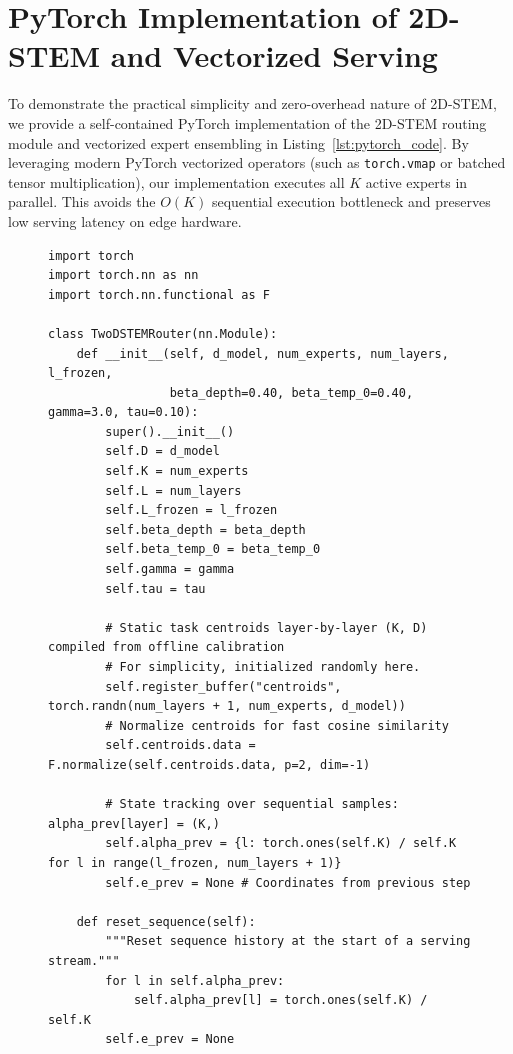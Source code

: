 \section{PyTorch Implementation of 2D-STEM and Vectorized Serving}
\label{sec:pytorch_implementation}

To demonstrate the practical simplicity and zero-overhead nature of 2D-STEM, we provide a self-contained PyTorch implementation of the 2D-STEM routing module and vectorized expert ensembling in Listing~\ref{lst:pytorch_code}. By leveraging modern PyTorch vectorized operators (such as \texttt{torch.vmap} or batched tensor multiplication), our implementation executes all $K$ active experts in parallel. This avoids the $O(K)$ sequential execution bottleneck and preserves low serving latency on edge hardware.

\begin{figure}[htbp]
\centering
\begin{minipage}{0.95\textwidth}
\begin{small}
\begin{verbatim}
import torch
import torch.nn as nn
import torch.nn.functional as F

class TwoDSTEMRouter(nn.Module):
    def __init__(self, d_model, num_experts, num_layers, l_frozen, 
                 beta_depth=0.40, beta_temp_0=0.40, gamma=3.0, tau=0.10):
        super().__init__()
        self.D = d_model
        self.K = num_experts
        self.L = num_layers
        self.L_frozen = l_frozen
        self.beta_depth = beta_depth
        self.beta_temp_0 = beta_temp_0
        self.gamma = gamma
        self.tau = tau
        
        # Static task centroids layer-by-layer (K, D) compiled from offline calibration
        # For simplicity, initialized randomly here.
        self.register_buffer("centroids", torch.randn(num_layers + 1, num_experts, d_model))
        # Normalize centroids for fast cosine similarity
        self.centroids.data = F.normalize(self.centroids.data, p=2, dim=-1)
        
        # State tracking over sequential samples: alpha_prev[layer] = (K,)
        self.alpha_prev = {l: torch.ones(self.K) / self.K for l in range(l_frozen, num_layers + 1)}
        self.e_prev = None # Coordinates from previous step
        
    def reset_sequence(self):
        """Reset sequence history at the start of a serving stream."""
        for l in self.alpha_prev:
            self.alpha_prev[l] = torch.ones(self.K) / self.K
        self.e_prev = None


\end{verbatim}
\end{small}
\end{minipage}
\end{figure}
